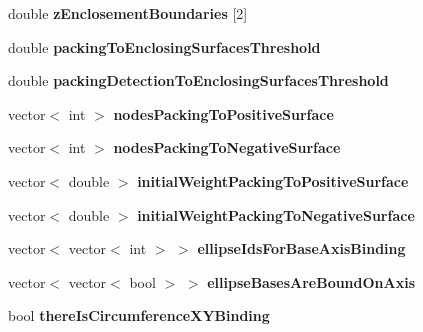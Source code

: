 \begin{DoxyCompactItemize}
\item 
\hypertarget{classSimulation_a22bbc8742aed21f955c74c0ae2d60e59}{}double {\bfseries z\+Enclosement\+Boundaries} \mbox{[}2\mbox{]}\label{classSimulation_a22bbc8742aed21f955c74c0ae2d60e59}

\item 
\hypertarget{classSimulation_acc9eacb89b824cb028ff9e36cf2a8eda}{}double {\bfseries packing\+To\+Enclosing\+Surfaces\+Threshold}\label{classSimulation_acc9eacb89b824cb028ff9e36cf2a8eda}

\item 
\hypertarget{classSimulation_a95a1b9f341e5485d7c83e638062e1751}{}double {\bfseries packing\+Detection\+To\+Enclosing\+Surfaces\+Threshold}\label{classSimulation_a95a1b9f341e5485d7c83e638062e1751}

\item 
\hypertarget{classSimulation_a0a32a20db47180868df937d28d0d86a9}{}vector$<$ int $>$ {\bfseries nodes\+Packing\+To\+Positive\+Surface}\label{classSimulation_a0a32a20db47180868df937d28d0d86a9}

\item 
\hypertarget{classSimulation_a68757f4f41161f048823471d3bd7b60b}{}vector$<$ int $>$ {\bfseries nodes\+Packing\+To\+Negative\+Surface}\label{classSimulation_a68757f4f41161f048823471d3bd7b60b}

\item 
\hypertarget{classSimulation_a68b123f575696b61db4f4614771f1315}{}vector$<$ double $>$ {\bfseries initial\+Weight\+Packing\+To\+Positive\+Surface}\label{classSimulation_a68b123f575696b61db4f4614771f1315}

\item 
\hypertarget{classSimulation_a1a76043febe90da0da40e07d0c0335c4}{}vector$<$ double $>$ {\bfseries initial\+Weight\+Packing\+To\+Negative\+Surface}\label{classSimulation_a1a76043febe90da0da40e07d0c0335c4}

\item 
\hypertarget{classSimulation_a1ac73b375b28baf80f6b0608385b9842}{}vector$<$ vector$<$ int $>$ $>$ {\bfseries ellipse\+Ids\+For\+Base\+Axis\+Binding}\label{classSimulation_a1ac73b375b28baf80f6b0608385b9842}

\item 
\hypertarget{classSimulation_ac0d5214698a8607eee067fb8d275e479}{}vector$<$ vector$<$ bool $>$ $>$ {\bfseries ellipse\+Bases\+Are\+Bound\+On\+Axis}\label{classSimulation_ac0d5214698a8607eee067fb8d275e479}

\item 
\hypertarget{classSimulation_a38a26592cb20108652c8101026de864b}{}bool {\bfseries there\+Is\+Circumference\+X\+Y\+Binding}\label{classSimulation_a38a26592cb20108652c8101026de864b}


\end{DoxyCompactItemize}
